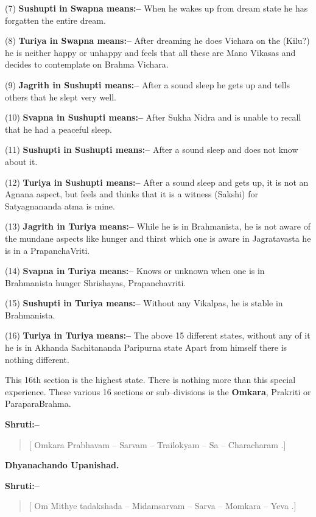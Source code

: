(7) \textbf{Sushupti in Swapna means:–} When he wakes up from dream state he has forgatten the entire dream.

(8) \textbf{Turiya in Swapna means:–} After dreaming he does Vichara on the (Kilu?) he is neither happy or unhappy and feels that all these are Mano Vikasas and decides to contemplate on Brahma Vichara.

(9) \textbf{Jagrith in Sushupti means:–} After a sound sleep he gets up and tells others that he slept very well.

(10) \textbf{Svapna in Sushupti means:–} After Sukha Nidra and is unable to recall that he had a peaceful sleep.

(11) \textbf{Sushupti in Sushupti means:–} After a sound sleep and does not know about it.

(12) \textbf{Turiya in Sushupti means:–} After a sound sleep and gets up, it is not an Agnana aspect, but feels and thinks that it is a witness (Sakshi) for Satyagnananda atma is mine.

(13) \textbf{Jagrith in Turiya means:–} While he is in Brahmanista, he is not aware of the mundane aspects like hunger and thirst which one is aware in Jagratavasta he is in a PrapanchaVriti.

(14) \textbf{Svapna in Turiya means:–} Knows or unknown when one is in Brahmanista hunger Shrishayas, Prapanchavriti.

(15) \textbf{Sushupti in Turiya means:–} Without any Vikalpas, he is stable in Brahmanista.

(16) \textbf{Turiya in Turiya means:–} The above 15 different states, without any of it he is in Akhanda Sachitananda Paripurna state Apart from himself there is nothing different.

This 16th section is the highest state. There is nothing more than this special experience. These various 16 sections or sub–divisions is the \textbf{Omkara}, Prakriti or ParaparaBrahma.

\textbf{Shruti:–}

\begin{verse}
[ Omkara Prabhavam – Sarvam – Trailokyam – Sa – Characharam .]
\end{verse}

\begin{flushright}
\textbf{Dhyanachando Upanishad.}
\end{flushright}

\textbf{Shruti:–}

\begin{verse}
[ Om Mithye tadakshada – Midamsarvam – Sarva – Momkara – Yeva .]
\end{verse}

